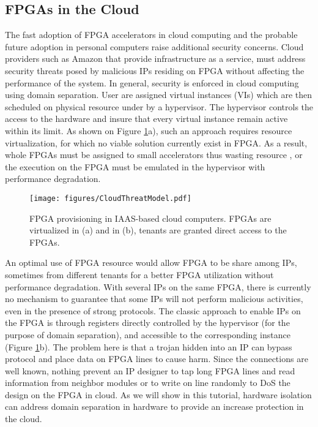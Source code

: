 \documentclass[sigconf]{acmart}
\theoremstyle{plain}
\theoremstyle{remark}
\begin{document}
\subsection{FPGAs in the Cloud}

The fast adoption of FPGA accelerators in cloud computing and the probable future adoption in personal computers raise additional security concerns. Cloud providers such as Amazon that provide infrastructure as a service, must address security threats posed by malicious IPs residing on FPGA without affecting the performance of the system. In general, security is enforced in cloud computing using domain separation. User are assigned virtual instances (VIs) which are then scheduled on physical resource under by a hypervisor. The hypervisor controls the access to the hardware and insure that every virtual instance remain active within its limit. As shown on Figure \ref{fig:iaas-fpga}a), such an approach requires resource virtualization, for which no viable solution currently exist in FPGA. As a result, whole FPGAs must be assigned to small accelerators thus wasting resource , or the execution on the FPGA must be emulated in the hypervisor with performance degradation.

\begin{figure}[h]
\centering
\texttt{[image: figures/CloudThreatModel.pdf]}
\caption{FPGA provisioning in IAAS-based cloud computers. FPGAs are virtualized in (a) and in (b), tenants are granted direct access to the FPGAs.}
\label{fig:iaas-fpga}
\end{figure}

An optimal use of FPGA resource would allow FPGA to be share among IPs, sometimes from different tenants for a better FPGA utilization without performance degradation. With several IPs on the same FPGA, there is currently no mechanism to guarantee that some IPs will not perform malicious activities, even in the presence of strong protocols. The classic approach to enable IPs on the FPGA is through registers directly controlled by the hypervisor (for the purpose of domain separation), and accessible to the corresponding instance (Figure \ref{fig:iaas-fpga}b). The problem here is that a trojan hidden into an IP can bypass protocol and place data on FPGA lines to cause harm. Since the connections are well known, nothing prevent an IP designer to tap long FPGA lines and read information from neighbor modules or to write on line randomly to DoS the design on the FPGA in cloud. As we will show in this tutorial, hardware isolation can address domain separation in hardware to provide an increase protection in the cloud.
\end{document}
